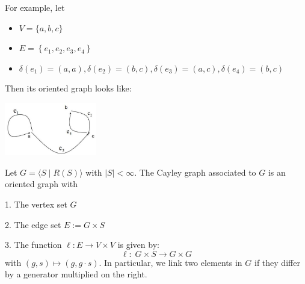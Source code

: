 For example, let
\begin{itemize}
\item \(V = \{ a,b,c\}\)
\item \(E = \left\{  {{e}_{1},{e}_{2},{e}_{3},{e}_{4}}\right\}\)
\item \(\delta \left( {e}_{1}\right)  = \left( {a,a}\right),\delta \left( {e}_{2}\right)  = \left( {b,c}\right),\delta \left( {e}_{3}\right)  = \left( {a,c}\right),\delta \left( {e}_{4}\right)  = \left( {b,c}\right)\)
\end{itemize}
Then its oriented graph looks like:
\begin{center}
\includegraphics[width=0.3\textwidth]{images/Ch6_oriented_graph.jpg}
\end{center}

\begin{definition}  Let \(G = \langle S \mid  R\left( S\right) \rangle\) with \(\left| S\right|  < \infty\). The Cayley graph associated to \(G\) is an oriented graph with

1. The vertex set \(G\)

2. The edge set \(E \mathrel{\text{ := }} G \times  S\)

3. The function \(\ell  : E \rightarrow  V \times  V\) is given by:
\[\ell  : \;G \times  S \rightarrow  G \times  G\]
with \(\left( {g,s}\right)  \mapsto  \left( {g,g \cdot  s}\right)\). In particular, we link two elements in \(G\) if they differ by a generator multiplied on the right.
\end{definition}

